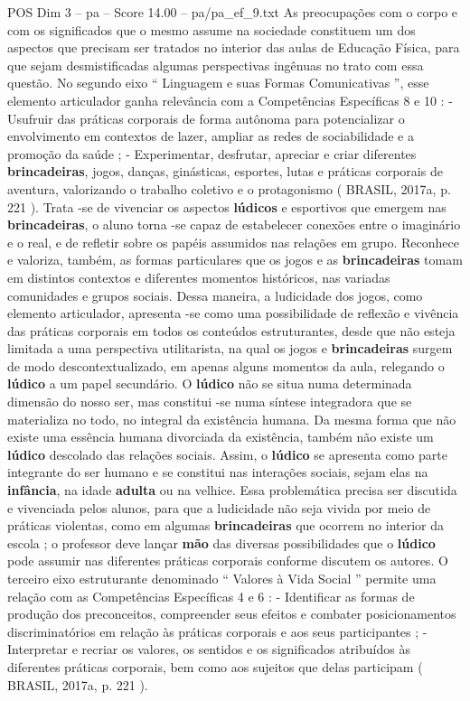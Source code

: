 \begin{textsample}{POS Dim 3 – pa – Score 14.00 – pa/pa\_ef\_9.txt}
As preocupações com o corpo e com os significados que o mesmo assume na sociedade constituem um dos aspectos que precisam ser tratados no interior das aulas de Educação Física, para que sejam desmistificadas algumas perspectivas ingênuas no trato com essa questão.
No segundo eixo “ Linguagem e suas Formas Comunicativas ”, esse elemento articulador ganha relevância com a Competências Específicas 8 e 10 : - Usufruir das práticas corporais de forma autônoma para potencializar o envolvimento em contextos de lazer, ampliar as redes de sociabilidade e a promoção da saúde ; - Experimentar, desfrutar, apreciar e criar diferentes \textbf{brincadeiras}, jogos, danças, ginásticas, esportes, lutas e práticas corporais de aventura, valorizando o trabalho coletivo e o protagonismo ( BRASIL, 2017a, p. 221 ).
Trata -se de vivenciar os aspectos \textbf{lúdicos} e esportivos que emergem nas \textbf{brincadeiras}, o aluno torna -se capaz de estabelecer conexões entre o imaginário e o real, e de refletir sobre os papéis assumidos nas relações em grupo.
Reconhece e valoriza, também, as formas particulares que os jogos e as \textbf{brincadeiras} tomam em distintos contextos e diferentes momentos históricos, nas variadas comunidades e grupos sociais.
Dessa maneira, a ludicidade dos jogos, como elemento articulador, apresenta -se como uma possibilidade de reflexão e vivência das práticas corporais em todos os conteúdos estruturantes, desde que não esteja limitada a uma perspectiva utilitarista, na qual os jogos e \textbf{brincadeiras} surgem de modo descontextualizado, em apenas alguns momentos da aula, relegando o \textbf{lúdico} a um papel secundário.
O \textbf{lúdico} não se situa numa determinada dimensão do nosso ser, mas constitui -se numa síntese integradora que se materializa no todo, no integral da existência humana.
Da mesma forma que não existe uma essência humana divorciada da existência, também não existe um \textbf{lúdico} descolado das relações sociais.
Assim, o \textbf{lúdico} se apresenta como parte integrante do ser humano e se constitui nas interações sociais, sejam elas na \textbf{infância}, na idade \textbf{adulta} ou na velhice.
Essa problemática precisa ser discutida e vivenciada pelos alunos, para que a ludicidade não seja vivida por meio de práticas violentas, como em algumas \textbf{brincadeiras} que ocorrem no interior da escola ; o professor deve lançar \textbf{mão} das diversas possibilidades que o \textbf{lúdico} pode assumir nas diferentes práticas corporais conforme discutem os autores.
O terceiro eixo estruturante denominado “ Valores à Vida Social ” permite uma relação com as Competências Específicas 4 e 6 : - Identificar as formas de produção dos preconceitos, compreender seus efeitos e combater posicionamentos discriminatórios em relação às práticas corporais e aos seus participantes ; - Interpretar e recriar os valores, os sentidos e os significados atribuídos às diferentes práticas corporais, bem como aos sujeitos que delas participam ( BRASIL, 2017a, p. 221 ).

\end{textsample}
